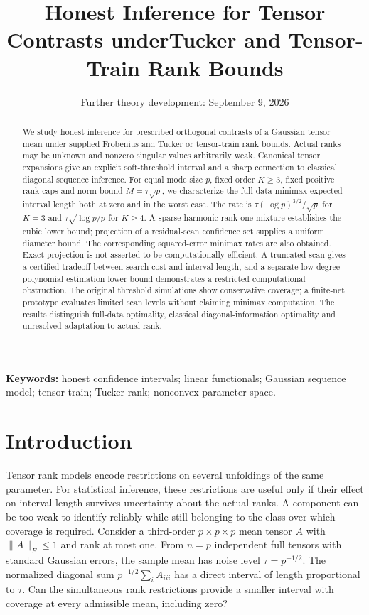 \documentclass[11pt]{article}
\title{Honest Inference for Tensor Contrasts under\newline Tucker and Tensor-Train Rank Bounds}
\author{}
\date{Further theory development: September 9, 2026}
\theoremstyle{remark}
\newcommand{\norm}[1]{\lVert #1\rVert}
\begin{document}
\maketitle

\begin{abstract}
We study honest inference for prescribed orthogonal contrasts of a Gaussian tensor mean under supplied Frobenius and Tucker or tensor-train rank bounds. Actual ranks may be unknown and nonzero singular values arbitrarily weak. Canonical tensor expansions give an explicit soft-threshold interval and a sharp connection to classical diagonal sequence inference. For equal mode size $p$, fixed order $K\ge3$, fixed positive rank caps and norm bound $M=\tau\sqrt p$, we characterize the full-data minimax expected interval length both at zero and in the worst case. The rate is $\tau(\log p)^{3/2}/\sqrt p$ for $K=3$ and $\tau\sqrt{\log p/p}$ for $K\ge4$. A sparse harmonic rank-one mixture establishes the cubic lower bound; projection of a residual-scan confidence set supplies a uniform diameter bound. The corresponding squared-error minimax rates are also obtained. Exact projection is not asserted to be computationally efficient. A truncated scan gives a certified tradeoff between search cost and interval length, and a separate low-degree polynomial estimation lower bound demonstrates a restricted computational obstruction. The original threshold simulations show conservative coverage; a finite-net prototype evaluates limited scan levels without claiming minimax computation. The results distinguish full-data optimality, classical diagonal-information optimality and unresolved adaptation to actual rank.
\end{abstract}

\noindent\textbf{Keywords:} honest confidence intervals; linear functionals; Gaussian sequence model; tensor train; Tucker rank; nonconvex parameter space.

\section{Introduction}\label{sec:intro}

Tensor rank models encode restrictions on several unfoldings of the same parameter. For statistical inference, these restrictions are useful only if their effect on interval length survives uncertainty about the actual ranks. A component can be too weak to identify reliably while still belonging to the class over which coverage is required. Consider a third-order $p\times p\times p$ mean tensor $A$ with $\norm A_F\le1$ and rank at most one. From $n=p$ independent full tensors with standard Gaussian errors, the sample mean has noise level $\tau=p^{-1/2}$. The normalized diagonal sum $p^{-1/2}\sum_i A_{iii}$ has a direct interval of length proportional to $\tau$. Can the simultaneous rank restrictions provide a smaller interval with coverage at every admissible mean, including zero?
\end{document}
